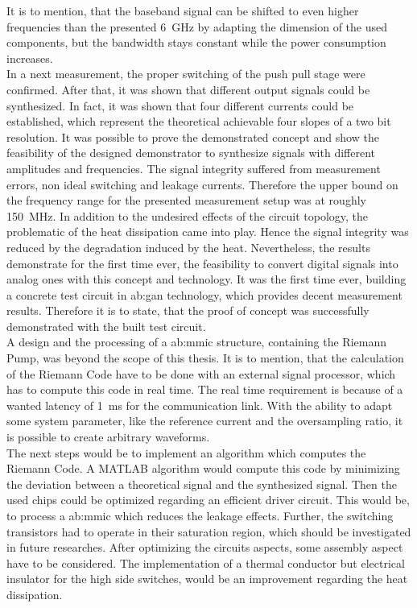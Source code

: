 It is to mention, that the baseband signal can be shifted to even higher frequencies than the presented \SI{6}{\giga \hertz} by adapting the dimension of the used components, but the bandwidth stays constant while the power consumption increases.\\
In a next measurement, the proper switching of the push pull stage were confirmed.
After that, it was shown that different output signals could be synthesized.
In fact, it was shown that four different currents could be established, which represent the theoretical achievable four slopes of a two bit resolution.
It was possible to prove the demonstrated concept and show the feasibility of the designed demonstrator to synthesize signals with different amplitudes and frequencies.
The signal integrity suffered from measurement errors, non ideal switching and leakage currents.
Therefore the upper bound on the frequency range for the presented measurement setup was at roughly \SI{150}{\mega \hertz}.
In addition to the undesired effects of the circuit topology, the problematic of the heat dissipation came into play.
Hence the signal integrity was reduced by the degradation induced by the heat.
Nevertheless, the results demonstrate for the first time ever, the feasibility to convert digital signals into analog ones with this concept and technology.
It was the first time ever, building a concrete test circuit in \gls{ab:gan} technology, which provides decent measurement results.
Therefore it is to state, that the proof of concept was successfully demonstrated with the built test circuit.\\
A design and the processing of a \gls{ab:mmic} structure, containing the Riemann Pump, was beyond the scope of this thesis.
It is to mention, that the calculation of the Riemann Code have to be done with an external signal processor, which has to compute this code in real time. 
The real time requirement is because of a wanted latency of \SI{1}{\milli \second} for the communication link.
With the ability to adapt some system parameter, like the reference current and the oversampling ratio, it is possible to create arbitrary waveforms.\\
The next steps would be to implement an algorithm which computes the Riemann Code.
A MATLAB algorithm would compute this code by minimizing the deviation between a theoretical signal and the synthesized signal.
Then the used chips could be optimized regarding an efficient driver circuit.
This would be, to process a \gls{ab:mmic} which reduces the leakage effects.
Further, the switching transistors had to operate in their saturation region, which should be investigated in future researches.
After optimizing the circuits aspects, some assembly aspect have to be considered.
The implementation of a thermal conductor but electrical insulator for the high side switches, would be an improvement regarding the heat dissipation.




